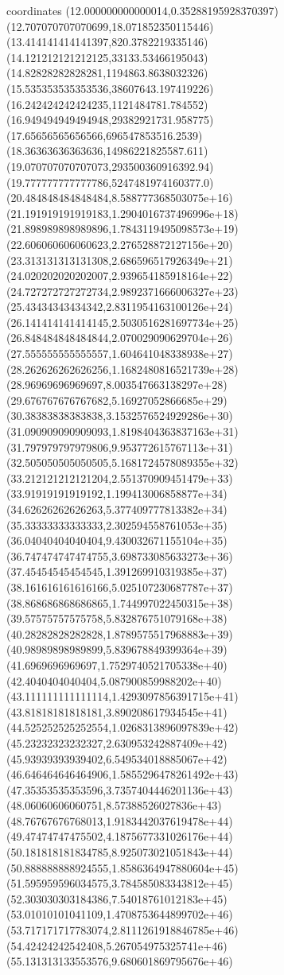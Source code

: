 coordinates {%
(12.000000000000014,0.35288195928370397)
(12.707070707070699,18.071852350115446)
(13.414141414141397,820.3782219335146)
(14.121212121212125,33133.53466195043)
(14.82828282828281,1194863.8638032326)
(15.535353535353536,38607643.197419226)
(16.242424242424235,1121484781.784552)
(16.949494949494948,29382921731.958775)
(17.65656565656566,696547853516.2539)
(18.36363636363636,14986221825587.611)
(19.070707070707073,293500360916392.94)
(19.777777777777786,5247481974160377.0)
(20.484848484848484,8.588777368503075e+16)
(21.191919191919183,1.2904016737496996e+18)
(21.898989898989896,1.7843119495098573e+19)
(22.606060606060623,2.276528872127156e+20)
(23.313131313131308,2.686596517926349e+21)
(24.020202020202007,2.939654185918164e+22)
(24.727272727272734,2.9892371666006327e+23)
(25.43434343434342,2.8311954163100126e+24)
(26.141414141414145,2.5030516281697734e+25)
(26.848484848484844,2.070029090629704e+26)
(27.555555555555557,1.604641048338938e+27)
(28.262626262626256,1.1682480816521739e+28)
(28.96969696969697,8.003547663138297e+28)
(29.676767676767682,5.16927052866685e+29)
(30.38383838383838,3.1532576524929286e+30)
(31.090909090909093,1.8198404363837163e+31)
(31.797979797979806,9.953772615767113e+31)
(32.505050505050505,5.1681724578089355e+32)
(33.212121212121204,2.551370909451479e+33)
(33.91919191919192,1.199413006858877e+34)
(34.62626262626263,5.377409777813382e+34)
(35.33333333333333,2.302594558761053e+35)
(36.04040404040404,9.430032671155104e+35)
(36.747474747474755,3.698733085633273e+36)
(37.45454545454545,1.391269910319385e+37)
(38.161616161616166,5.025107230687787e+37)
(38.868686868686865,1.744997022450315e+38)
(39.57575757575758,5.832876751079168e+38)
(40.28282828282828,1.8789575517968883e+39)
(40.98989898989899,5.839678849399364e+39)
(41.6969696969697,1.7529740521705338e+40)
(42.4040404040404,5.087900859988202e+40)
(43.111111111111114,1.4293097856391715e+41)
(43.81818181818181,3.890208617934545e+41)
(44.525252525252554,1.0268313896097839e+42)
(45.23232323232327,2.630953242887409e+42)
(45.93939393939402,6.549534018885067e+42)
(46.646464646464906,1.5855296478261492e+43)
(47.35353535353596,3.7357404446201136e+43)
(48.06060606060751,8.57388526027836e+43)
(48.76767676768013,1.9183442037619478e+44)
(49.47474747475502,4.1875677331026176e+44)
(50.181818181834785,8.925073021051843e+44)
(50.888888888924555,1.8586364947880604e+45)
(51.595959596034575,3.784585083343812e+45)
(52.303030303184386,7.54018761012183e+45)
(53.01010101041109,1.4708753644899702e+46)
(53.717171717783074,2.8111261918846785e+46)
(54.42424242542408,5.267054975325741e+46)
(55.131313133553576,9.680601869795676e+46)
}
